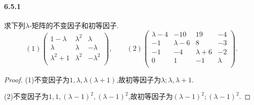 \documentclass[11pt]{article}
\begin{document}
\paragraph{6.5.1}求下列$\lambda$-矩阵的不变因子和初等因子.
$$(1)\begin{pmatrix}
    1-\lambda  & \lambda ^2 & \lambda  \\
    \lambda  & \lambda  & -\lambda  \\
    \lambda ^2+1 & \lambda ^2 & -\lambda ^2 \\
\end{pmatrix}, \qquad (2)\begin{pmatrix}
    \lambda -4 & -10 & 19 & -4 \\
    -1 & \lambda -6 & 8 & -3 \\
    -1 & -4 & \lambda +6 & -2 \\
    0 & 1 & -1 & \lambda  \\
\end{pmatrix}.$$
\begin{proof}
    (1)不变因子为$1,\lambda,\lambda(\lambda+1)$,故初等因子为$\lambda;\lambda,\lambda+1$.
    
    (2)不变因子为$1,1,(\lambda-1)^2,(\lambda-1)^2$,故初等因子为$(\lambda-1)^2;(\lambda-1)^2$.
\end{proof}
\end{document}
